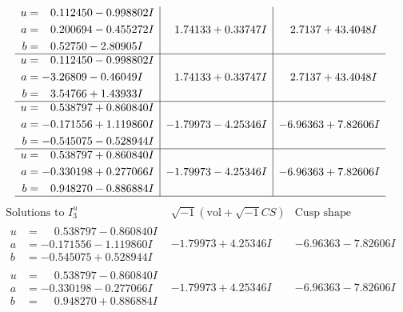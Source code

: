 \documentclass[1p]{elsarticle_modified}
\theoremstyle{definition}
\newcommand{\I}{\sqrt{-1}}
\begin{document}
$$\begin{array}{c|c|c}
\begin{aligned}
u &= \phantom{-}0.112450 - 0.998802 I \\
a &= \phantom{-}0.200694 - 0.455272 I \\
b &= \phantom{-}0.52750 - 2.80905 I\end{aligned}
 & \phantom{-}1.74133 + 0.33747 I & \phantom{-}2.7137 + 43.4048 I \\ \hline\begin{aligned}
u &= \phantom{-}0.112450 - 0.998802 I \\
a &= -3.26809 - 0.46049 I \\
b &= \phantom{-}3.54766 + 1.43933 I\end{aligned}
 & \phantom{-}1.74133 + 0.33747 I & \phantom{-}2.7137 + 43.4048 I \\ \hline\begin{aligned}
u &= \phantom{-}0.538797 + 0.860840 I \\
a &= -0.171556 + 1.119860 I \\
b &= -0.545075 - 0.528944 I\end{aligned}
 & -1.79973 - 4.25346 I & -6.96363 + 7.82606 I \\ \hline\begin{aligned}
u &= \phantom{-}0.538797 + 0.860840 I \\
a &= -0.330198 + 0.277066 I \\
b &= \phantom{-}0.948270 - 0.886884 I\end{aligned}
 & -1.79973 - 4.25346 I & -6.96363 + 7.82606 I\\
 \hline 
 \end{array}$$\newpage$$\begin{array}{c|c|c}  
\text{Solutions to }I^u_{3}& \I (\text{vol} + \sqrt{-1}CS) & \text{Cusp shape}\\
 \hline 
\begin{aligned}
u &= \phantom{-}0.538797 - 0.860840 I \\
a &= -0.171556 - 1.119860 I \\
b &= -0.545075 + 0.528944 I\end{aligned}
 & -1.79973 + 4.25346 I & -6.96363 - 7.82606 I \\ \hline\begin{aligned}
u &= \phantom{-}0.538797 - 0.860840 I \\
a &= -0.330198 - 0.277066 I \\
b &= \phantom{-}0.948270 + 0.886884 I\end{aligned}
 & -1.79973 + 4.25346 I & -6.96363 - 7.82606 I \\ \hline\begin{aligned}

\end{aligned}
\end{array}$$
\end{document}
